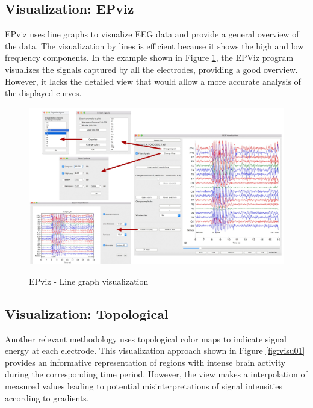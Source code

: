 \documentclass[format=sigconf]{acmart}
\begin{document}
		\subsection{Visualization: EPviz \cite{currey2023epviz}}
			\par EPviz uses line graphs to visualize EEG data \cite{currey2023epviz} and provide a general overview of the data. The visualization by lines is efficient because it shows the high and low frequency components. In the example shown in Figure \ref{fig:epviz00}, the EPViz program visualizes the signals captured by all the electrodes, providing a good overview. However, it lacks the detailed view that would allow a more accurate analysis of the displayed curves.			
		
			\begin{figure}[h]
				\centering
				\caption{EPviz - Line graph visualization}
				\includegraphics[width=\linewidth]{../presentation/images/epviz00}
				\label{fig:epviz00}
			\end{figure}
	
		\subsection{Visualization: Topological \cite{9098189}}
			\par Another relevant methodology uses topological color maps to indicate signal energy at each electrode. This visualization approach shown in Figure \ref{fig:visu01} provides an informative representation of regions with intense brain activity during the corresponding time period. However, the view makes a interpolation of measured values leading to potential misinterpretations of signal intensities according to gradients.
			
\end{document}
